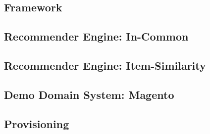 \setmonofont{Consolas}

\subsection{Framework}



\subsection{Recommender Engine: In-Common}



\subsection{Recommender Engine: Item-Similarity}



\subsection{Demo Domain System: Magento}



\subsection{Provisioning}
\label{appendix-soure-code-provisioning}


